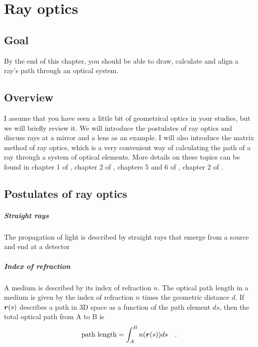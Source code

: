 \renewcommand{\lastmod}{September 22, 2023}
\renewcommand{\chapterauthors}{Markus Lippitz}

\chapter{Ray optics}


\section{Goal}

By the end of this chapter, you should be able to draw, calculate and align a ray's path through an optical system.



\section{Overview}

I assume that you have seen a little bit of geometrical optics in your studies, but we will briefly review it. We will introduce the postulates of ray optics and discuss rays at a mirror and a lens as an example. I will also introduce the matrix method of ray optics, which is a very convenient way of calculating the path of a ray through a system of optical elements. More details on these topics can be found in chapter 1 of \cite{SalehTeich1991}, chapter 2 of \cite{Hering_Martin_Optik},  chapters 5 and 6 of \cite{Hecht_Optics}, chapter 2 of \cite{Konijnenberg_Optics}.


\section{Postulates of ray optics}

\paragraph*{Straight rays}  The propagation of light is described by straight rays that emerge from a source and end at a detector

\paragraph*{Index of refraction} A medium is described by its index of refraction $n$. The optical path length in a medium is given by the index of refraction $n$ times the geometric distance $d$. If $\boldsymbol{r}(s)$ describes a path in 3D space as a function of the path element $ds$, then the total optical path from A to B is
\begin{equation}
    \text{path length} = \int_A^B n(\boldsymbol{r}(s)) ds \quad .
\end{equation}

